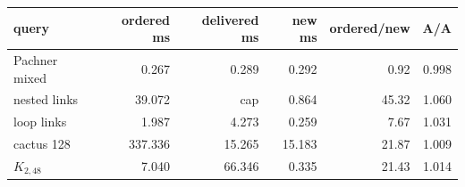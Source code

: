\begin{center}
\begin{tabular}{lrrrrr}
query & ordered ms & delivered ms & new ms & ordered/new & A/A\\
\hline
Pachner mixed & 0.267 & 0.289 & 0.292 & 0.92 & 0.998\\
nested links & 39.072 & cap & 0.864 & 45.32 & 1.060\\
loop links & 1.987 & 4.273 & 0.259 & 7.67 & 1.031\\
cactus 128 & 337.336 & 15.265 & 15.183 & 21.87 & 1.009\\
$K_{2,48}$ & 7.040 & 66.346 & 0.335 & 21.43 & 1.014\\
\end{tabular}
\end{center}
